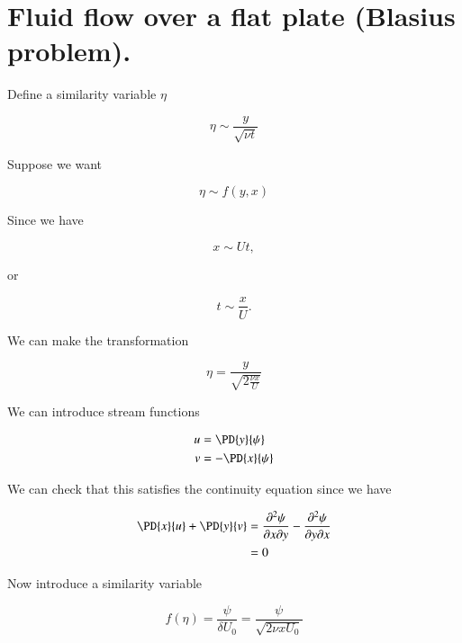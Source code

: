 \section{Fluid flow over a flat plate (Blasius problem).}

Define a similarity variable $\eta$ 

\begin{equation}\label{eqn:continuumL19:230}
\eta \sim \frac{y}{\sqrt{\nu t}}
\end{equation}

Suppose we want

\begin{equation}\label{eqn:continuumL19:250}
\eta \sim f(y, x)
\end{equation}

Since we have

\begin{equation}\label{eqn:continuumL19:270}
x \sim U t,
\end{equation}

or

\begin{equation}\label{eqn:continuumL19:290}
t \sim \frac{x}{U}.
\end{equation}

We can make the transformation

\begin{equation}\label{eqn:continuumL19:310}
\eta = \frac{y}{\sqrt{2 \frac{\nu x}{U}}}
\end{equation}

We can introduce stream functions

\begin{align}\label{eqn:continuumProblemSet2:330}
u &= \PD{y}{\psi} \\
v &= -\PD{x}{\psi}
\end{align}

We can check that this satisfies the continuity equation since we have

\begin{align*}
\PD{x}{u} + \PD{y}{v} 
&=
\frac{\partial^2 \psi}{\partial x \partial y}
-\frac{\partial^2 \psi}{\partial y \partial x} \\
&= 0
\end{align*}

Now introduce a similarity variable 

\begin{equation}\label{eqn:continuumL19:350}
f(\eta) = \frac{\psi}{\delta U_0} = \frac{\psi}{\sqrt{2 \nu x U_0}}
\end{equation}

